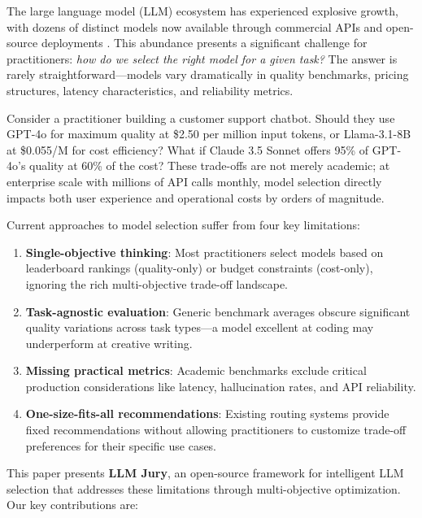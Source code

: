 \documentclass[11pt,a4paper]{article}
\begin{document}
The large language model (LLM) ecosystem has experienced explosive growth, with dozens of distinct models now available through commercial APIs and open-source deployments \cite{artificialanalysis2024, openrouter2024}. This abundance presents a significant challenge for practitioners: \textit{how do we select the right model for a given task?} The answer is rarely straightforward---models vary dramatically in quality benchmarks, pricing structures, latency characteristics, and reliability metrics.

Consider a practitioner building a customer support chatbot. Should they use GPT-4o for maximum quality at \$2.50 per million input tokens, or Llama-3.1-8B at \$0.055/M for cost efficiency? What if Claude 3.5 Sonnet offers 95\% of GPT-4o's quality at 60\% of the cost? These trade-offs are not merely academic; at enterprise scale with millions of API calls monthly, model selection directly impacts both user experience and operational costs by orders of magnitude.

Current approaches to model selection suffer from four key limitations:
\begin{enumerate}
    \item \textbf{Single-objective thinking}: Most practitioners select models based on leaderboard rankings (quality-only) or budget constraints (cost-only), ignoring the rich multi-objective trade-off landscape.
    \item \textbf{Task-agnostic evaluation}: Generic benchmark averages obscure significant quality variations across task types---a model excellent at coding may underperform at creative writing.
    \item \textbf{Missing practical metrics}: Academic benchmarks exclude critical production considerations like latency, hallucination rates, and API reliability.
    \item \textbf{One-size-fits-all recommendations}: Existing routing systems provide fixed recommendations without allowing practitioners to customize trade-off preferences for their specific use cases.
\end{enumerate}

This paper presents \textbf{LLM Jury}, an open-source framework for intelligent LLM selection that addresses these limitations through multi-objective optimization. Our key contributions are:
\end{document}
